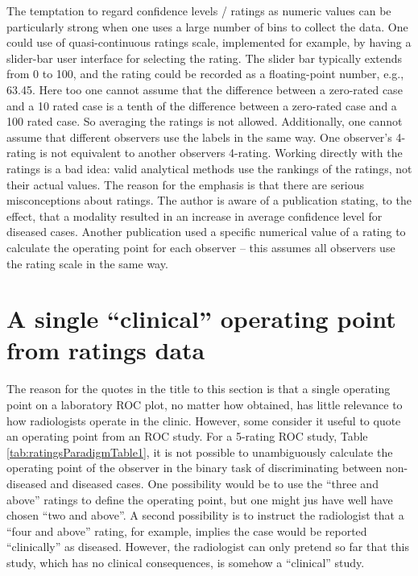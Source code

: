 \documentclass[
]{book}
\begin{document}
The temptation to regard confidence levels / ratings as numeric values can be particularly strong when one uses a large number of bins to collect the data. One could use of quasi-continuous ratings scale, implemented for example, by having a slider-bar user interface for selecting the rating. The slider bar typically extends from 0 to 100, and the rating could be recorded as a floating-point number, e.g., 63.45. Here too one cannot assume that the difference between a zero-rated case and a 10 rated case is a tenth of the difference between a zero-rated case and a 100 rated case. So averaging the ratings is not allowed. Additionally, one cannot assume that different observers use the labels in the same way. One observer's 4-rating is not equivalent to another observers 4-rating. Working directly with the ratings is a bad idea: valid analytical methods use the rankings of the ratings, not their actual values. The reason for the emphasis is that there are serious misconceptions about ratings. The author is aware of a publication stating, to the effect, that a modality resulted in an increase in average confidence level for diseased cases. Another publication used a specific numerical value of a rating to calculate the operating point for each observer -- this assumes all observers use the rating scale in the same way.

\hypertarget{a-single-clinical-operating-point-from-ratings-data}{%
\section{A single ``clinical'' operating point from ratings data}\label{a-single-clinical-operating-point-from-ratings-data}}

The reason for the quotes in the title to this section is that a single operating point on a laboratory ROC plot, no matter how obtained, has little relevance to how radiologists operate in the clinic. However, some consider it useful to quote an operating point from an ROC study. For a 5-rating ROC study, Table \ref{tab:ratingsParadigmTable1}, it is not possible to unambiguously calculate the operating point of the observer in the binary task of discriminating between non-diseased and diseased cases. One possibility would be to use the ``three and above'' ratings to define the operating point, but one might jus have well have chosen ``two and above''. A second possibility is to instruct the radiologist that a ``four and above'' rating, for example, implies the case would be reported ``clinically'' as diseased. However, the radiologist can only pretend so far that this study, which has no clinical consequences, is somehow a ``clinical'' study.
\end{document}
